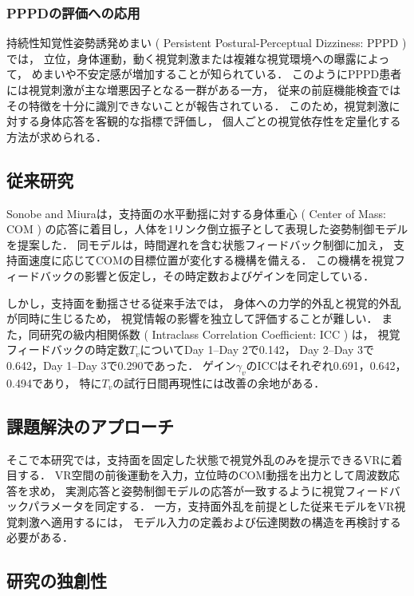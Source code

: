 \documentclass[a4paper,9pt,twocolumn]{ltjsarticle}
\begin{document}
\subsubsection{PPPDの評価への応用}

持続性知覚性姿勢誘発めまい ( Persistent Postural-Perceptual Dizziness: PPPD ) では，
立位，身体運動，動く視覚刺激または複雑な視覚環境への曝露によって，
めまいや不安定感が増加することが知られている\cite{staab2017}．
このようにPPPD患者には視覚刺激が主な増悪因子となる一群がある一方，
従来の前庭機能検査ではその特徴を十分に識別できないことが報告されている\cite{yagi2021}．
このため，視覚刺激に対する身体応答を客観的な指標で評価し，
個人ごとの視覚依存性を定量化する方法が求められる．

\subsection{従来研究}

Sonobe and Miuraは，支持面の水平動揺に対する身体重心 ( Center of Mass: COM ) の応答に着目し，人体を1リンク倒立振子として表現した姿勢制御モデルを提案した\cite{sonobe2025}．
同モデルは，時間遅れを含む状態フィードバック制御に加え，
支持面速度に応じてCOMの目標位置が変化する機構を備える．
この機構を視覚フィードバックの影響と仮定し，その時定数およびゲインを同定している．

しかし，支持面を動揺させる従来手法では，
身体への力学的外乱と視覚的外乱が同時に生じるため，
視覚情報の影響を独立して評価することが難しい．
また，同研究の級内相関係数 ( Intraclass Correlation Coefficient: ICC ) は，
視覚フィードバックの時定数$T_v$についてDay 1--Day 2で0.142，
Day 2--Day 3で0.642，Day 1--Day 3で0.290であった\cite{sonobe2025}．
ゲイン$\gamma_v$のICCはそれぞれ0.691，0.642，0.494であり，
特に$T_v$の試行日間再現性には改善の余地がある．

\subsection{課題解決のアプローチ}

そこで本研究では，支持面を固定した状態で視覚外乱のみを提示できるVRに着目する．
VR空間の前後運動を入力，立位時のCOM動揺を出力として周波数応答を求め，
実測応答と姿勢制御モデルの応答が一致するように視覚フィードバックパラメータを同定する．
一方，支持面外乱を前提とした従来モデルをVR視覚刺激へ適用するには，
モデル入力の定義および伝達関数の構造を再検討する必要がある．

\subsection{研究の独創性}
\end{document}
